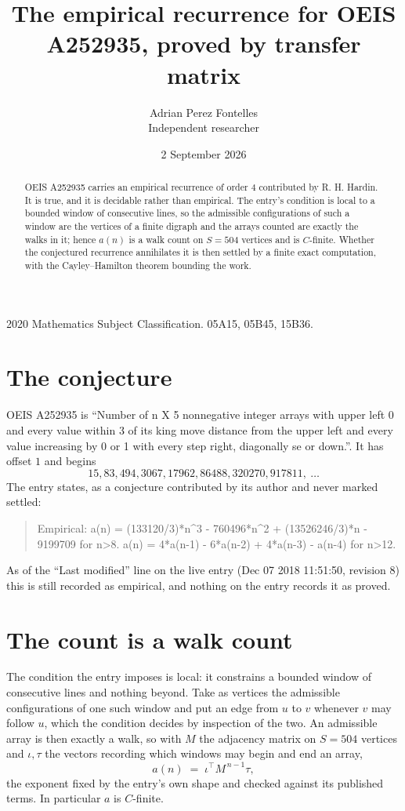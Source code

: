 \documentclass[11pt,a4paper]{article}
\title{The empirical recurrence for OEIS A252935, proved by transfer matrix}
\author{Adrian Perez Fontelles\\ \small Independent researcher}
\date{2 September 2026}
\theoremstyle{plain}
\theoremstyle{definition}
\begin{document}
\maketitle

\begin{abstract}
OEIS A252935 carries an empirical recurrence of order $4$ contributed by R. H. Hardin. It is
true, and it is decidable rather than empirical. The entry's condition is local to a bounded window of consecutive lines, so
the admissible configurations of such a window are the vertices of a finite digraph and the
arrays counted are exactly the walks in it; hence $a(n)$ is a walk count on $S=504$ vertices
and is $C$-finite. Whether the conjectured recurrence annihilates it is then settled by a
finite exact computation, with the Cayley--Hamilton theorem bounding the work.
\end{abstract}

\noindent\small 2020 Mathematics Subject Classification. 05A15, 05B45, 15B36.\normalsize

\section{The conjecture}

OEIS A252935 is ``Number of n X 5 nonnegative integer arrays with upper left 0 and every value within 3 of its king move distance from the upper left and every value increasing by 0 or 1 with every step right, diagonally se or down.''. It has offset $1$ and begins
\[
15, 83, 494, 3067, 17962, 86488, 320270, 917811,\ \dots
\]
The entry states, as a conjecture contributed by its author and never marked settled:
\begin{quote}
Empirical: a(n) = (133120/3)*n\^{}3 - 760496*n\^{}2 + (13526246/3)*n - 9199709 for n>8. a(n) = 4*a(n-1) - 6*a(n-2) + 4*a(n-3) - a(n-4) for n>12.
\end{quote}
As of the ``Last modified'' line on the live entry (Dec 07 2018 11:51:50, revision 8) this is still
recorded as empirical, and nothing on the entry records it as proved.

\section{The count is a walk count}

The condition the entry imposes is local: it constrains a bounded window of consecutive lines and nothing beyond. Take as
vertices the admissible configurations of one such window and put an edge from $u$ to $v$
whenever $v$ may follow $u$, which the condition decides by inspection of the two. An
admissible array is then exactly a walk, so with $M$ the adjacency matrix on $S=504$ vertices
and $\iota,\tau$ the vectors recording which windows may begin and end an array,
\[
a(n)\;=\;\iota^{\!\top}M^{\,n-1}\tau ,
\]
the exponent fixed by the entry's own shape and checked against its published terms. In
particular $a$ is $C$-finite.
\end{document}
